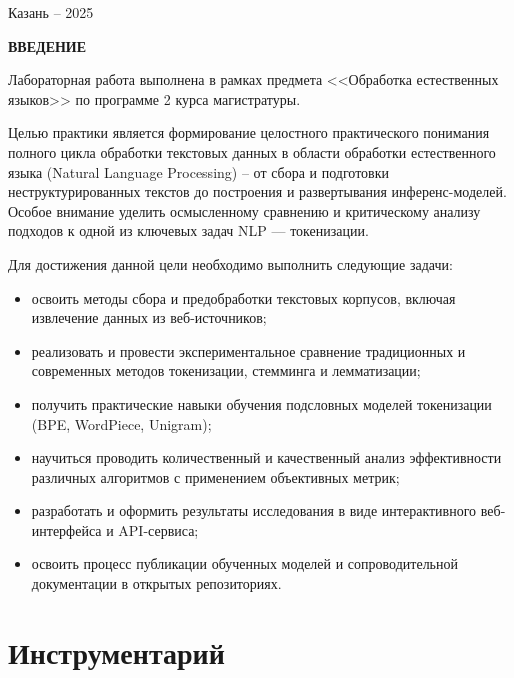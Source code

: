 \documentclass[a4paper,article]{article}
\theoremstyle{mystyle}
\newcommand{\customsection}[1]{
	\phantomsection%
  	\addcontentsline{toc}{section}{#1}%
    {
        \centering
        \textbf{\normalsize\selectfont #1} \par
    }
}
\newcommand{\mystyleitemize}[1]{
  \begin{itemize}[label=--, 
				leftmargin=0pt,%
    				labelindent=\parindent,%
    				labelsep=1cm,%
    				itemindent=*,%
    				nolistsep%
    				]
    #1
  \end{itemize}
}
\begin{document}
\begin{sloppypar}
\begin{titlepage}
		\vfill
		
		\begin{center}
            Казань -- 2025
        \end{center}
	\end{titlepage}
	
	\newpage

    \setcounter{page}{2}

    \tableofcontents

    \newpage
    
    \customsection{ВВЕДЕНИЕ}
    
		Лабораторная работа выполнена в рамках предмета <<Обработка естественных языков>> по программе 2 курса магистратуры.
	
		Целью практики является формирование целостного практического понимания полного цикла обработки текстовых данных в области обработки естественного языка (Natural Language Processing) -- от сбора и подготовки неструктурированных текстов до построения и развертывания инференс-моделей. Особое внимание уделить осмысленному сравнению и критическому анализу подходов к одной из ключевых задач NLP — токенизации.
	
		Для достижения данной цели необходимо выполнить следующие задачи:
	
		\mystyleitemize{
    			\item освоить методы сбора и предобработки текстовых корпусов, включая извлечение данных из веб-источников;
    			\item реализовать и провести экспериментальное сравнение традиционных и современных методов токенизации, стемминга и лемматизации;
    			\item получить практические навыки обучения подсловных моделей токенизации (BPE, WordPiece, Unigram);
    			\item научиться проводить количественный и качественный анализ эффективности различных алгоритмов с применением объективных метрик;
    			\item разработать и оформить результаты исследования в виде интерактивного веб-интерфейса и API-сервиса;
    			\item освоить процесс публикации обученных моделей и сопроводительной документации в открытых репозиториях.
		}

	\newpage
	\section{Инструментарий}
	

\end{sloppypar}
\end{document}
